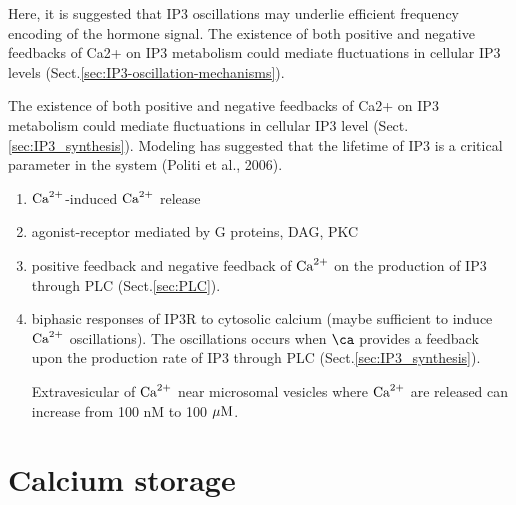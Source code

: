 Here, it is suggested that IP3 oscillations may underlie efficient frequency
encoding of the hormone signal. The existence of both positive and negative
feedbacks of Ca2+ on IP3 metabolism could mediate fluctuations in cellular IP3
levels (Sect.\ref{sec:IP3-oscillation-mechanisms}).

The existence of both positive and negative feedbacks of Ca2+ on IP3 metabolism
could mediate fluctuations in cellular IP3 level (Sect.\ref{sec:IP3_synthesis}).
Modeling has suggested that the lifetime of IP3 is a critical parameter in the
system (Politi et al., 2006).


% 
% 
% 
% 


\begin{enumerate}

  \item ${\text{Ca}^{2+}}$-induced ${\text{Ca}^{2+}}$ release
  
  \item agonist-receptor mediated by G proteins, DAG, PKC
  
  \item positive feedback and negative feedback of ${\text{Ca}^{2+}}$ on the production of
  IP3 through PLC (Sect.\ref{sec:PLC}).
  
  \item biphasic responses of IP3R to cytosolic calcium (maybe sufficient to
  induce ${\text{Ca}^{2+}}$ oscillations). The oscillations occurs when $\ca$ provides a
  feedback upon the production rate of IP3 through PLC
  (Sect.\ref{sec:IP3_synthesis}).

Extravesicular of ${\text{Ca}^{2+}}$ near microsomal vesicles where ${\text{Ca}^{2+}}$ are released can
increase from 100 nM to 100 ${\mu\text{M}}$.
\end{enumerate}







\section{Calcium storage}


